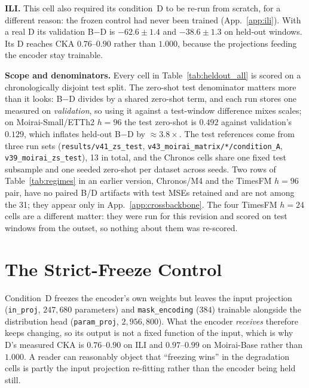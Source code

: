 \documentclass{article}
\begin{document}
\textbf{ILI.} This cell also required its condition~D to be re-run from scratch, for a different
reason: the frozen control had never been trained (App.~\ref{app:ili}). With a real D its
validation B$-$D is $-62.6{\pm}1.4$ and $-38.6{\pm}1.3$ on held-out windows. Its D reaches CKA $0.76$--$0.90$ rather than $1.000$, because the
projections feeding the encoder stay trainable.

\textbf{Scope and denominators.} Every cell in Table~\ref{tab:heldout_all} is scored on a
chronologically disjoint test split. The zero-shot test denominator matters more than it looks:
B$-$D divides by a shared zero-shot term, and each run stores one measured on \emph{validation}, so
using it against a test-window difference mixes scales; on Moirai-Small/ETTh2 $h{=}96$ the test
zero-shot is $0.492$ against validation's $0.129$, which inflates held-out B$-$D by ${\approx}3.8
\times$. The test references come from three run sets
(\texttt{results/v41\_zs\_test}, \texttt{v43\_moirai\_matrix/*/condition\_A},
\texttt{v39\_moirai\_zs\_test}), 13 in total, and the Chronos cells share one fixed test subsample
and one seeded zero-shot per dataset across seeds. Two rows of Table~\ref{tab:regimes} in an earlier
version, Chronos/M4 and the TimesFM $h{=}96$ pair, have no paired B/D artifacts with test MSEs
retained and are not among the 31; they appear only in App.~\ref{app:crossbackbone}. The four
TimesFM $h{=}24$ cells are a different matter: they were run for this revision and scored on test
windows from the outset, so nothing about them was re-scored.

\section{The Strict-Freeze Control}
\label{app:strictfreeze}

Condition~D freezes the encoder's own weights but leaves the input projection
(\texttt{in\_proj}, $247{,}680$ parameters) and \texttt{mask\_encoding} ($384$) trainable alongside
the distribution head (\texttt{param\_proj}, $2{,}956{,}800$). What the encoder \emph{receives}
therefore keeps changing, so its output is not a fixed function of the input, which is why D's
measured CKA is $0.76$--$0.90$ on ILI and $0.97$--$0.99$ on Moirai-Base rather than $1.000$. A
reader can reasonably object that ``freezing wins'' in the degradation cells is partly the input
projection re-fitting rather than the encoder being held still.
\end{document}
